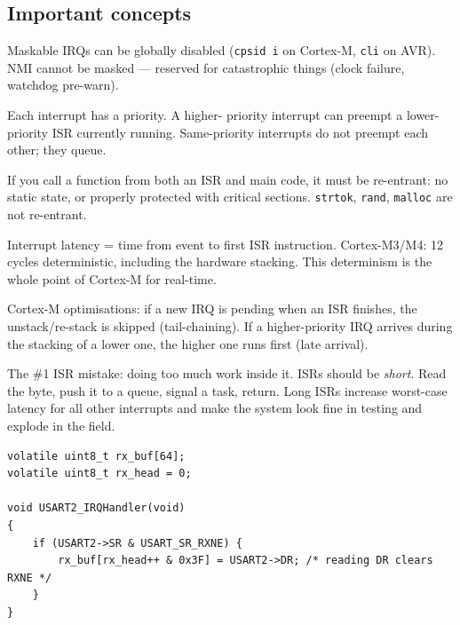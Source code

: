 \documentclass[11pt,a4paper]{article}
\begin{document}
\subsection{Important concepts}

\begin{description}[leftmargin=*, style=nextline]
    \item[Maskable vs.\ Non-Maskable (NMI).] Maskable IRQs can be globally
    disabled (\texttt{cpsid i} on Cortex-M, \texttt{cli} on AVR). NMI cannot
    be masked --- reserved for catastrophic things (clock failure, watchdog
    pre-warn).
    \item[Priority \& preemption.] Each interrupt has a priority. A higher-
    priority interrupt can preempt a lower-priority ISR currently running.
    Same-priority interrupts do not preempt each other; they queue.
    \item[Re-entrancy.] If you call a function from both an ISR and main
    code, it must be re-entrant: no static state, or properly protected
    with critical sections. \texttt{strtok}, \texttt{rand}, \texttt{malloc}
    are not re-entrant.
    \item[Latency.] Interrupt latency = time from event to first ISR
    instruction. Cortex-M3/M4: 12 cycles deterministic, including the
    hardware stacking. This determinism is the whole point of Cortex-M for
    real-time.
    \item[Tail-chaining \& late arrival.] Cortex-M optimisations: if a new
    IRQ is pending when an ISR finishes, the unstack/re-stack is skipped
    (tail-chaining). If a higher-priority IRQ arrives during the stacking
    of a lower one, the higher one runs first (late arrival).
\end{description}

\begin{warning}
The \#1 ISR mistake: doing too much work inside it. ISRs should be
\emph{short}. Read the byte, push it to a queue, signal a task, return.
Long ISRs increase worst-case latency for all other interrupts and make the
system look fine in testing and explode in the field.
\end{warning}

\begin{lstlisting}[style=C, caption={Typical ISR pattern (STM32 HAL)}]
volatile uint8_t rx_buf[64];
volatile uint8_t rx_head = 0;

void USART2_IRQHandler(void)
{
    if (USART2->SR & USART_SR_RXNE) {
        rx_buf[rx_head++ & 0x3F] = USART2->DR; /* reading DR clears RXNE */
    }
}
\end{lstlisting}
\end{document}
